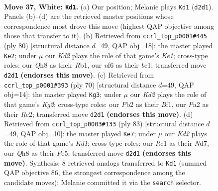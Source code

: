 \documentclass[11pt]{article}
\begin{document}
\clearpage

\begin{figure}[p]\centering
\begin{subfigure}{0.46\textwidth}\centering
\resizebox{\linewidth}{!}{%
\newchessgame
\chessboard[
  setfen={7Q/5k2/r4n2/1b1P4/p3p3/6p1/PPPK2P1/2R5 w - - 0 37},
  showmover=false,
  pgfstyle=straightmove, color=movearrow, markmove={d2-d1}
]}
\caption{}
\end{subfigure}\hfill
\begin{subfigure}{0.46\textwidth}\centering
\resizebox{\linewidth}{!}{%
\newchessgame
\chessboard[
  setfen={8/7B/1p3p1p/2r5/1p1k3P/8/PP3P2/1Rb1K3 w - - 0 41},
  showmover=false,
  pgfstyle=straightmove, color=movearrow, markmove={e1-e2}
]}
\caption{}
\end{subfigure}
\\[4pt]
\begin{subfigure}{0.46\textwidth}\centering
\resizebox{\linewidth}{!}{%
\newchessgame
\chessboard[
  setfen={5k2/1b3p2/7p/4r1p1/4p1PP/4P3/2R2PK1/5B2 w - - 0 36},
  showmover=false,
  pgfstyle=straightmove, color=movearrow, markmove={g2-g3}
]}
\caption{}
\end{subfigure}\hfill
\begin{subfigure}{0.46\textwidth}\centering
\resizebox{\linewidth}{!}{%
\newchessgame
\chessboard[
  setfen={3k4/3n1p2/2RN4/p3p2p/4P1pP/r5P1/5P2/6K1 b - - 3 42},
  showmover=false,
  pgfstyle=straightmove, color=movearrow, markmove={d8-e7}
]}
\caption{}
\end{subfigure}
\caption{\textbf{Move 37, White: \texttt{Kd1}.} (a) Our position; Melanie plays \texttt{Kd1} (\texttt{d2d1}). Panels (b)--(d) are the retrieved master positions whose correspondence most drove this move (highest QAP objective among those that transfer to it). (b) Retrieved from \texttt{ccrl\_top\_p0001\#445} (ply 80) [structural distance $d$=49, QAP obj=18]: the master played \texttt{Ke2}; under $\mu$ our \emph{Kd2} plays the role of that game's \emph{Ke1}; cross-type roles: our \emph{Q}h8 as their \emph{R}b1, our \emph{n}f6 as their \emph{b}c1; transferred move \texttt{d2d1} \textbf{(endorses this move)}. (c) Retrieved from \texttt{ccrl\_top\_p0001\#393} (ply 70) [structural distance $d$=49, QAP obj=14]: the master played \texttt{Kg3}; under $\mu$ our \emph{Kd2} plays the role of that game's \emph{Kg2}; cross-type roles: our \emph{P}b2 as their \emph{B}f1, our \emph{P}a2 as their \emph{R}c2; transferred move \texttt{d2d1} \textbf{(endorses this move)}. (d) Retrieved from \texttt{ccrl\_top\_p0003\#133} (ply 83) [structural distance $d$=49, QAP obj=10]: the master played \texttt{Ke7}; under $\mu$ our \emph{Kd2} plays the role of that game's \emph{Kd1}; cross-type roles: our \emph{R}c1 as their \emph{N}d7, our \emph{Q}h8 as their \emph{P}e5; transferred move \texttt{d2d1} \textbf{(endorses this move)}. Synthesis: 8 retrieved analogs transferred to \texttt{Kd1} (summed QAP objective 86, the strongest correspondence among the candidate moves); Melanie committed it via the \texttt{search} selector.}
\label{fig:thought-m72}
\end{figure}
\end{document}
